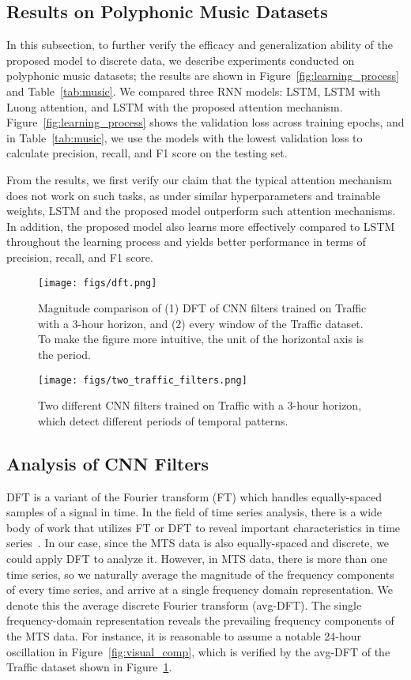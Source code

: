 \subsection{Results on Polyphonic Music Datasets}
In this subsection, to further verify the efficacy and generalization ability of the proposed model to discrete data, we describe experiments conducted on polyphonic music datasets;
the results are shown in Figure~\ref{fig:learning_process} and Table~\ref{tab:music}.
We compared three RNN models: LSTM, LSTM with Luong attention, and LSTM with the proposed attention mechanism.
Figure~\ref{fig:learning_process} shows the validation loss across training epochs, and in Table~\ref{tab:music}, we use the models with the lowest validation loss to calculate precision, recall, and F1 score on the testing set.

From the results, we first verify our claim that the typical attention mechanism does not work on such tasks, as under similar hyperparameters and trainable weights, LSTM and the proposed model outperform such attention mechanisms.
In addition, the proposed model also learns more effectively compared to LSTM throughout the learning process and yields better performance in terms of precision, recall, and F1 score.

\begin{figure}[t]
  \centering
  \texttt{[image: figs/dft.png]}
  \caption{Magnitude comparison of (1) DFT of CNN filters trained on Traffic with a 3-hour horizon, and (2) every window of the Traffic dataset. To make the figure more intuitive, the unit of the horizontal axis is the period.}
  \label{fig:dft}
\end{figure}

\begin{figure}[t]
  \centering
  \texttt{[image: figs/two\_traffic\_filters.png]}
  \caption{Two different CNN filters trained on Traffic with a 3-hour horizon, which detect different periods of temporal patterns.}
  \label{fig:four_filters}
\end{figure}

\subsection{Analysis of CNN Filters}
DFT is a variant of the Fourier transform (FT) which handles equally-spaced samples of a signal in time.
In the field of time series analysis, there is a wide body of work that utilizes FT or DFT to reveal important characteristics in time series~\cite{Fourier_0,Fourier_1}.
In our case, since the MTS data is also equally-spaced and discrete, we could apply DFT to analyze it.
However, in MTS data, there is more than one time series, so we naturally average the magnitude of the frequency components of every time series, and arrive at a single frequency domain representation.
We denote this the average discrete Fourier transform (avg-DFT).
The single frequency-domain representation reveals the prevailing frequency components of the MTS data.
For instance, it is reasonable to assume a notable 24-hour oscillation in Figure~\ref{fig:visual_comp}, which is verified by the avg-DFT of the Traffic dataset shown in Figure~\ref{fig:dft}.

